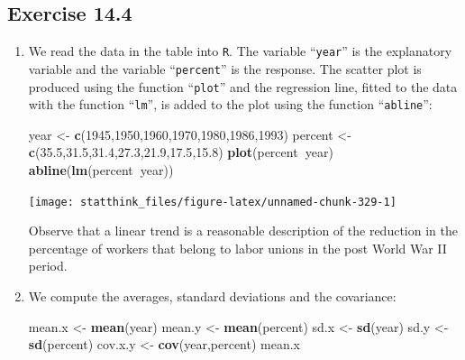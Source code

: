 \documentclass[
]{krantz}
\makeatletter
\newenvironment{Shaded}{\begin{snugshade}}{\end{snugshade}}
\newcommand{\DecValTok}[1]{\textcolor[rgb]{0.00,0.00,0.81}{#1}}
\newcommand{\FloatTok}[1]{\textcolor[rgb]{0.00,0.00,0.81}{#1}}
\newcommand{\KeywordTok}[1]{\textcolor[rgb]{0.13,0.29,0.53}{\textbf{#1}}}
\newcommand{\NormalTok}[1]{#1}
\newcommand{\OperatorTok}[1]{\textcolor[rgb]{0.81,0.36,0.00}{\textbf{#1}}}
\newcommand{\StringTok}[1]{\textcolor[rgb]{0.31,0.60,0.02}{#1}}
\newenvironment{kframe}{%
\medskip{}
\setlength{\fboxsep}{.8em}
 \def\at@end@of@kframe{}%
 \ifinner\ifhmode%
  \def\at@end@of@kframe{\end{minipage}}%
  \begin{minipage}{\columnwidth}%
 \fi\fi%
 \def\FrameCommand##1{\hskip\@totalleftmargin \hskip-\fboxsep
 \colorbox{shadecolor}{##1}\hskip-\fboxsep
     \hskip-\linewidth \hskip-\@totalleftmargin \hskip\columnwidth}%
 \MakeFramed {\advance\hsize-\width
   \@totalleftmargin\z@ \linewidth\hsize
   \@setminipage}}%
 {\par\unskip\endMakeFramed%
 \at@end@of@kframe}
\renewenvironment{Shaded}{\begin{kframe}}{\end{kframe}}
\theoremstyle{definition}
\theoremstyle{definition}
\theoremstyle{definition}
\theoremstyle{remark}
\makeatother
\begin{document}
\hypertarget{exercise-14.4}{%
\subsection*{Exercise 14.4}\label{exercise-14.4}}


\begin{enumerate}
\def\labelenumi{\arabic{enumi}.}
\item
  We read the data in the table into
  \texttt{R}. The variable ``\texttt{year}'' is the explanatory variable and the variable
  ``\texttt{percent}'' is the response. The scatter plot is produced using the
  function ``\texttt{plot}'' and the regression line, fitted to the data with the
  function ``\texttt{lm}'', is added to the plot using the function ``\texttt{abline}'':

\begin{Shaded}
\begin{Highlighting}[]
\NormalTok{year <-}\StringTok{ }\KeywordTok{c}\NormalTok{(}\DecValTok{1945}\NormalTok{,}\DecValTok{1950}\NormalTok{,}\DecValTok{1960}\NormalTok{,}\DecValTok{1970}\NormalTok{,}\DecValTok{1980}\NormalTok{,}\DecValTok{1986}\NormalTok{,}\DecValTok{1993}\NormalTok{)}
\NormalTok{percent <-}\StringTok{ }\KeywordTok{c}\NormalTok{(}\FloatTok{35.5}\NormalTok{,}\FloatTok{31.5}\NormalTok{,}\FloatTok{31.4}\NormalTok{,}\FloatTok{27.3}\NormalTok{,}\FloatTok{21.9}\NormalTok{,}\FloatTok{17.5}\NormalTok{,}\FloatTok{15.8}\NormalTok{)}
\KeywordTok{plot}\NormalTok{(percent}\OperatorTok{~}\NormalTok{year)}
\KeywordTok{abline}\NormalTok{(}\KeywordTok{lm}\NormalTok{(percent}\OperatorTok{~}\NormalTok{year))}
\end{Highlighting}
\end{Shaded}

  \begin{center}\texttt{[image: statthink\_files/figure-latex/unnamed-chunk-329-1]} \end{center}

  Observe that a linear trend is a
  reasonable description of the reduction in the percentage of workers
  that belong to labor unions in the post World War II period.
\item
  We compute the averages, standard
  deviations and the covariance:

\begin{Shaded}
\begin{Highlighting}[]
\NormalTok{mean.x <-}\StringTok{ }\KeywordTok{mean}\NormalTok{(year)}
\NormalTok{mean.y <-}\StringTok{ }\KeywordTok{mean}\NormalTok{(percent)}
\NormalTok{sd.x <-}\StringTok{ }\KeywordTok{sd}\NormalTok{(year)}
\NormalTok{sd.y <-}\StringTok{ }\KeywordTok{sd}\NormalTok{(percent)}
\NormalTok{cov.x.y <-}\StringTok{ }\KeywordTok{cov}\NormalTok{(year,percent)}
\NormalTok{mean.x}
\end{Highlighting}
\end{Shaded}


\end{enumerate}
\end{document}

